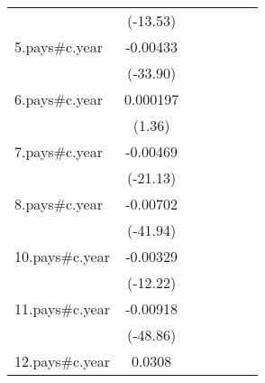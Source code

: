 {\begin{tabular}{l*{6}{c}}
                    &    (-13.53)         &                     &                     &                     &                     &                     \\
[1em]
5.pays#c.year       &    -0.00433\sym{***}&                     &                     &                     &                     &                     \\
                    &    (-33.90)         &                     &                     &                     &                     &                     \\
[1em]
6.pays#c.year       &    0.000197         &                     &                     &                     &                     &                     \\
                    &      (1.36)         &                     &                     &                     &                     &                     \\
[1em]
7.pays#c.year       &    -0.00469\sym{***}&                     &                     &                     &                     &                     \\
                    &    (-21.13)         &                     &                     &                     &                     &                     \\
[1em]
8.pays#c.year       &    -0.00702\sym{***}&                     &                     &                     &                     &                     \\
                    &    (-41.94)         &                     &                     &                     &                     &                     \\
[1em]
10.pays#c.year      &    -0.00329\sym{***}&                     &                     &                     &                     &                     \\
                    &    (-12.22)         &                     &                     &                     &                     &                     \\
[1em]
11.pays#c.year      &    -0.00918\sym{***}&                     &                     &                     &                     &                     \\
                    &    (-48.86)         &                     &                     &                     &                     &                     \\
[1em]
12.pays#c.year      &      0.0308\sym{***}&                     &                     &                     &                     &                     \\

\end{tabular}}
